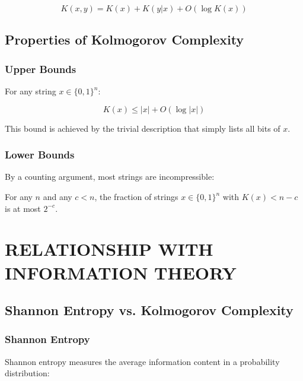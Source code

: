 \documentclass[12pt,a4paper]{report}
\begin{document}
\begin{theorem}
\begin{equation}
K(x, y) = K(x) + K(y|x) + O(\log K(x))
\end{equation}
\end{theorem}

\section{Properties of Kolmogorov Complexity}

\subsection{Upper Bounds}

For any string $x \in \{0,1\}^n$:

\begin{equation}
K(x) \leq |x| + O(\log |x|)
\end{equation}

This bound is achieved by the trivial description that simply lists all bits of $x$.

\subsection{Lower Bounds}

By a counting argument, most strings are incompressible:

\begin{theorem}
For any $n$ and any $c < n$, the fraction of strings $x \in \{0,1\}^n$ with $K(x) < n - c$ is at most $2^{-c}$.
\end{theorem}

\chapter{RELATIONSHIP WITH INFORMATION THEORY}

\section{Shannon Entropy vs. Kolmogorov Complexity}

\subsection{Shannon Entropy}

Shannon entropy measures the average information content in a probability distribution:
\end{document}
